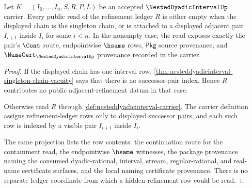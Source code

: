 \begin{theorem}
\label{thm:nesteddyadicinterval-adjacent-refinement-coverage}
Let $K=(I_0,\ldots,I_n,S,R,P,L)$ be an accepted $\NestedDyadicIntervalUp$ carrier. Every public read of the refinement ledger $R$ is either empty when the displayed chain is the singleton chain, or is attached to a displayed adjacent pair $I_{i+1}$ inside $I_i$ for some $i<n$. In the nonempty case, the read exposes exactly the pair's $\Cont$ route, endpointwise $\hsame$ rows, $\mathsf{Pkg}$ source provenance, and $\NameCert_{\NestedDyadicIntervalUp}$ provenance recorded in the carrier.
\end{theorem}
\begin{proof}
If the displayed chain has one interval row, \autoref{thm:nesteddyadicinterval-singleton-chain-vacuity} says that there is no successor-pair index. Hence $R$ contributes no public adjacent-refinement datum in that case.

Otherwise read $R$ through \autoref{def:nesteddyadicinterval-carrier}. The carrier definition assigns refinement-ledger rows only to displayed successor pairs, and each such row is indexed by a visible pair $I_{i+1}$ inside $I_i$.

The same projection lists the row contents: the continuation route for the containment read, the endpointwise $\hsame$ witnesses, the package provenance naming the consumed dyadic-rational, interval, stream, regular-rational, and real-name certificate surfaces, and the local naming certificate provenance. There is no separate ledger coordinate from which a hidden refinement row could be read.
\end{proof}

